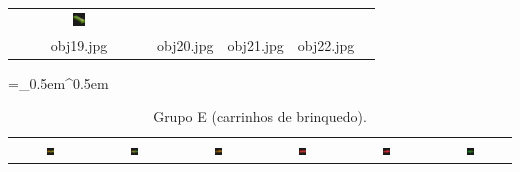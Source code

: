 \begin{table}[H]
\begin{tabu}{|ccccc|}
    \includegraphics[width=0.1\textwidth,height=0.1\textwidth]{imagens/coil_100/caixas/obj98__55.png} &
    \\
    \scriptsize{obj19.jpg} & \scriptsize{obj20.jpg} & \scriptsize{obj21.jpg} &
    \scriptsize{obj22.jpg} &
  \end{tabu}
\end{table}

\begin{table}[H]
  \centering
  \caption{Grupo E (carrinhos de brinquedo).}
  \tabulinesep =_0.5em^0.5em
  \everyrow{\tabucline[0.4pt]-}
  \begin{tabu}{|cccccc|}
    \includegraphics[width=0.1\textwidth,height=0.1\textwidth]{imagens/coil_100/carrinhos_brinquedos/obj6__0.png} &
    \includegraphics[width=0.1\textwidth,height=0.1\textwidth]{imagens/coil_100/carrinhos_brinquedos/obj8__0.png} &
    \includegraphics[width=0.1\textwidth,height=0.1\textwidth]{imagens/coil_100/carrinhos_brinquedos/obj15__0.png} &
    \includegraphics[width=0.1\textwidth,height=0.1\textwidth]{imagens/coil_100/carrinhos_brinquedos/obj19__0.png} &
    \includegraphics[width=0.1\textwidth,height=0.1\textwidth]{imagens/coil_100/carrinhos_brinquedos/obj23__0.png} &
    \includegraphics[width=0.1\textwidth,height=0.1\textwidth]{imagens/coil_100/carrinhos_brinquedos/obj27__0.png}

\end{tabu}
\end{table}
